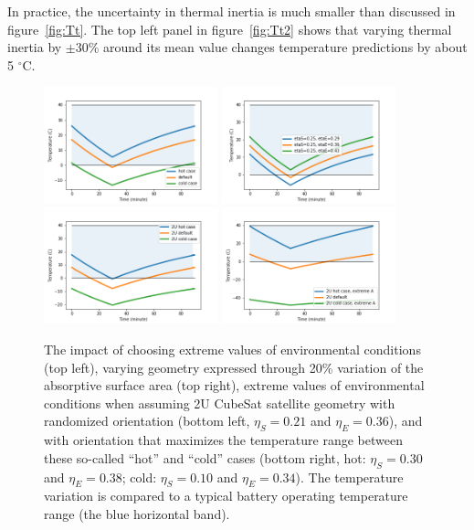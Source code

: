 \documentclass[]{aastex62}
\begin{document}
In practice, the uncertainty in thermal inertia is much smaller than discussed in figure~\ref{fig:Tt}.
The top left panel in figure~\ref{fig:Tt2} shows that varying thermal inertia by $\pm$30\% 
around its mean value changes temperature predictions by about  5 $^\circ$C. 


\begin{figure}[t]
\centering
\includegraphics[width=0.45\textwidth, keepaspectratio]{figures/3tempsVStime_BlackAnodizedShotVScold.png}    
\includegraphics[width=0.45\textwidth, keepaspectratio]{figures/3tempsVStime_BlackAnodized2UareaVariation.png} 
\includegraphics[width=0.45\textwidth, keepaspectratio]{figures/3tempsVStime_BlackAnodized2UhotVScold.png} 
\includegraphics[width=0.45\textwidth, keepaspectratio]{figures/3tempsVStime_BlackAnodized2UhotVScoldExtreme.png} 

\caption{The impact of choosing extreme values of environmental conditions (top left), varying geometry expressed
through 20\% variation of the absorptive surface area (top right), extreme values of environmental conditions when 
assuming 2U CubeSat satellite geometry with randomized orientation (bottom left, $\eta_S=0.21$ and $\eta_E=0.36$), 
and with orientation that maximizes the temperature range between these so-called ``hot'' and ``cold'' cases (bottom
right, hot: $\eta_S=0.30$ and $\eta_E=0.38$; cold:  $\eta_S=0.10$ and $\eta_E=0.34$).  The temperature variation is 
compared to a typical battery operating temperature range (the blue horizontal band).  
\label{fig:Tt3}}
\end{figure}
\end{document}
